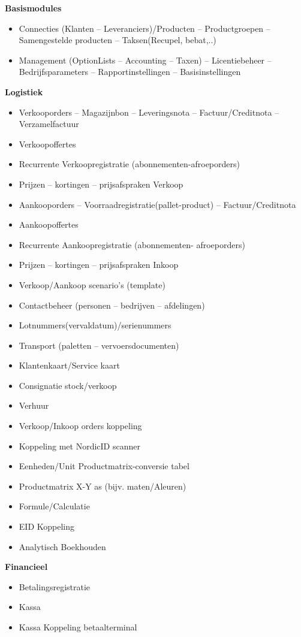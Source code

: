 \textbf{Basismodules}
\begin{itemize}
	\item Connecties (Klanten -- Leveranciers)/Producten -- Productgroepen -- Samengestelde producten -- Taksen(Recupel, bebat,..)
	\item Management (OptionLists -- Accounting -- Taxen) -- Licentiebeheer -- Bedrijfsparameters -- Rapportinstellingen -- Basisinstellingen
\end{itemize}

\textbf{Logistiek}
\begin{itemize}
	\item Verkooporders -- Magazijnbon -- Leveringsnota -- Factuur/Creditnota -- Verzamelfactuur
	\item Verkoopoffertes
	\item Recurrente Verkoopregistratie (abonnementen-afroeporders)
	\item Prijzen -- kortingen -- prijsafspraken Verkoop
	\item Aankooporders -- Voorraadregistratie(pallet-product) -- Factuur/Creditnota
	\item Aankoopoffertes
	\item Recurrente Aankoopregistratie (abonnementen- afroeporders)
	\item Prijzen -- kortingen -- prijsafspraken Inkoop
	\item Verkoop/Aankoop scenario's (template)
	\item Contactbeheer (personen -- bedrijven -- afdelingen)
	\item Lotnummers(vervaldatum)/serienummers
	\item Transport (paletten -- vervoersdocumenten)
	\item Klantenkaart/Service kaart
	\item Consignatie stock/verkoop
	\item Verhuur
	\item Verkoop/Inkoop orders koppeling
	\item Koppeling met NordicID scanner
	\item Eenheden/Unit Productmatrix-conversie tabel
	\item Productmatrix X-Y as (bijv. maten/Aleuren)
	\item Formule/Calculatie
	\item EID Koppeling
	\item Analytisch Boekhouden
\end{itemize}

\textbf{Financieel}
\begin{itemize}
	\item Betalingsregistratie
	\item Kassa
	\item Kassa Koppeling betaalterminal
\end{itemize}


